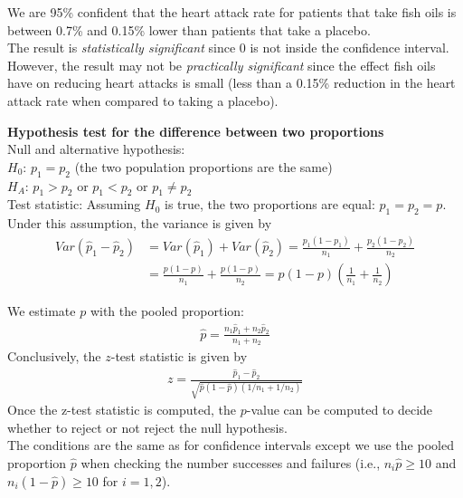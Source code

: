 \documentclass[12pt, fleqn]{article}\usepackage[]{graphicx}\usepackage[]{color}
\begin{document}
\begin{enumerate}[(a)]
{We are 95\% confident that the heart attack rate for patients that take fish oils is between 0.7\% and 0.15\% lower than patients that take a placebo.\\

The result is \emph{statistically significant} since 0 is not inside the confidence interval.  However, the result may not be \emph{practically significant} since the effect fish oils have on reducing heart attacks is small (less than a 0.15\% reduction in the heart attack rate when compared to taking a placebo).}

\end{enumerate}




\clearpage
\textbf{Hypothesis test for the difference between two proportions}\\

Null and alternative hypothesis:\\
$H_0$: $p_1 = p_2$ (the two population proportions are the same)\\
$H_A$: $p_1 > p_2$ or $p_1 < p_2$ or $p_1 \neq p_2$\\

Test statistic: Assuming $H_0$ is true, the two proportions are equal: $p_1 = p_2 = p$.  Under this assumption, the variance is given by
{\color{blue}
\begin{align*}
Var(\hat{p}_1 - \hat{p}_2) &= Var(\hat{p}_1) + Var(\hat{p}_2) = \frac{p_1 (1-p_1)}{n_1} + \frac{p_2(1-p_2)}{n_2}\\
&= \frac{p (1-p)}{n_1} + \frac{p(1-p)}{n_2} = p(1-p)\left( \frac{1}{n_1} + \frac{1}{n_2} \right)
\end{align*}}

We estimate $p$ with the pooled proportion:
\begin{align*}
\hat{p} = \frac{n_1 \hat{p}_1 + n_2 \hat{p}_2}{n_1 + n_2}
\end{align*}
Conclusively, the $z$-test statistic is given by
\begin{align*}
z = \frac{\hat{p}_1 - \hat{p}_2}{\sqrt{\hat{p}(1-\hat{p})(1/n_1 + 1 /n_2)}}
\end{align*}
Once the z-test statistic is computed, the $p$-value can be computed to decide whether to reject or not reject the null hypothesis.\\

The conditions are the same as for confidence intervals except we use the pooled proportion $\hat{p}$ when checking the number successes and failures (i.e., $n_i \hat{p} \geq 10$ and $n_i (1-\hat{p}) \geq 10$ for $i=1,2$).\\
\end{document}
